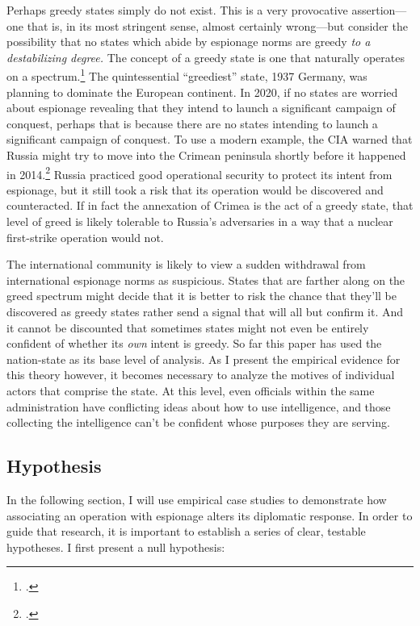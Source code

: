\documentclass[14pt]{extarticle}
\begin{document}
Perhaps greedy states simply do not exist. This is a very provocative assertion---one that is, in its most stringent sense, almost certainly wrong---but consider the possibility that no states which abide by espionage norms are greedy \emph{to a destabilizing degree.} The concept of a greedy state is one that naturally operates on a spectrum.\footcite[p.~39. Throughout his book, Glaser simplifies and complicates his theory as is necessary for the particular analysis he is performing. Greedy states can be understood as the opposite of security-seeking states, or it can be its own independant variable, allowing for the possibility of states that are greedy \emph{and} security-seeking, or just one of the two.]{glaser_rational_2010} The quintessential \enquote{greediest} state, 1937 Germany, was planning to dominate the European continent. In 2020, if no states are worried about espionage revealing that they intend to launch a significant campaign of conquest, perhaps that is because there are no states intending to launch a significant campaign of conquest. To use a modern example, the CIA warned that Russia might try to move into the Crimean peninsula shortly before it happened in 2014.\footcite{hosenball_ukraine_2014} Russia practiced good operational security to protect its intent from espionage, but it still took a risk that its operation would be discovered and counteracted. If in fact the annexation of Crimea is the act of a greedy state, that level of greed is likely tolerable to Russia's adversaries in a way that a nuclear first-strike operation would not.

The international community is likely to view a sudden withdrawal from international espionage norms as suspicious. States that are farther along on the greed spectrum might decide that it is better to risk the chance that they'll be discovered as greedy states rather send a signal that will all but confirm it. And it cannot be discounted that sometimes states might not even be entirely confident of whether its \emph{own} intent is greedy. So far this paper has used the nation-state as its base level of analysis. As I present the empirical evidence for this theory however, it becomes necessary to analyze the motives of individual actors that comprise the state. At this level, even officials within the same administration have conflicting ideas about how to use intelligence, and those collecting the intelligence can't be confident whose purposes they are serving.

\subsection{Hypothesis}
In the following section, I will use empirical case studies to demonstrate how associating an operation with espionage alters its diplomatic response. In order to guide that research, it is important to establish a series of clear, testable hypotheses. I first present a null hypothesis:
\end{document}
